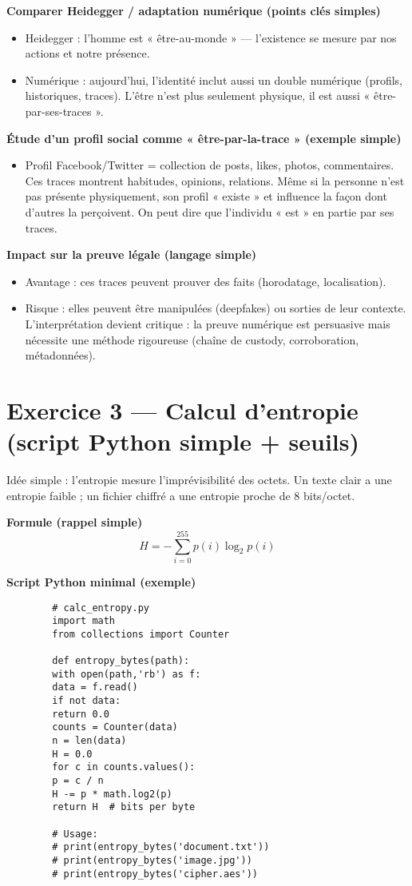 \documentclass[12pt,a4paper]{article}
\begin{document}
	\textbf{Comparer Heidegger / adaptation numérique (points clés simples)}  
	\begin{itemize}
		\item Heidegger : l’homme est « être-au-monde » — l’existence se mesure par nos actions et notre présence.
		\item Numérique : aujourd’hui, l’identité inclut aussi un double numérique (profils, historiques, traces). L’être n’est plus seulement physique, il est aussi « être-par-ses-traces ».
	\end{itemize}
	
	\textbf{Étude d’un profil social comme « être-par-la-trace » (exemple simple)}  
	\begin{itemize}
		\item Profil Facebook/Twitter = collection de posts, likes, photos, commentaires. Ces traces montrent habitudes, opinions, relations. Même si la personne n’est pas présente physiquement, son profil « existe » et influence la façon dont d’autres la perçoivent. On peut dire que l’individu « est » en partie par ses traces.
	\end{itemize}
	
	\textbf{Impact sur la preuve légale (langage simple)}  
	\begin{itemize}
		\item Avantage : ces traces peuvent prouver des faits (horodatage, localisation).
		\item Risque : elles peuvent être manipulées (deepfakes) ou sorties de leur contexte. L’interprétation devient critique : la preuve numérique est persuasive mais nécessite une méthode rigoureuse (chaîne de custody, corroboration, métadonnées).
	\end{itemize}
	
	\section*{Exercice 3 — Calcul d’entropie (script Python simple + seuils)}
	
	Idée simple : l’entropie mesure l’imprévisibilité des octets. Un texte clair a une entropie faible ; un fichier chiffré a une entropie proche de 8 bits/octet.
	
	\textbf{Formule (rappel simple)}  
	\[
	H = -\sum_{i=0}^{255} p(i) \log_2 p(i)
	\]
	
	\textbf{Script Python minimal (exemple)}  
	\begin{verbatim}
		# calc_entropy.py
		import math
		from collections import Counter
		
		def entropy_bytes(path):
		with open(path,'rb') as f:
		data = f.read()
		if not data:
		return 0.0
		counts = Counter(data)
		n = len(data)
		H = 0.0
		for c in counts.values():
		p = c / n
		H -= p * math.log2(p)
		return H  # bits per byte
		
		# Usage:
		# print(entropy_bytes('document.txt'))
		# print(entropy_bytes('image.jpg'))
		# print(entropy_bytes('cipher.aes'))
	\end{verbatim}
	
\end{document}
